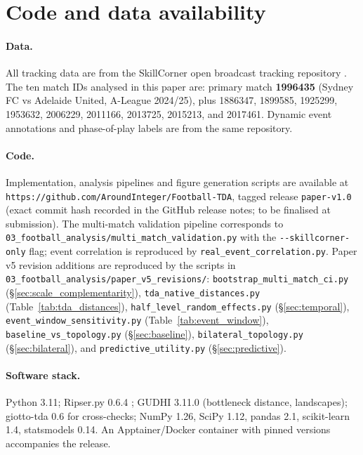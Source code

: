 \documentclass[11pt,a4paper]{article}
\begin{document}
\section*{Code and data availability}

\paragraph{Data.} All tracking data are from the SkillCorner open broadcast tracking repository \citep{SkillCorner2024}. The ten match IDs analysed in this paper are: primary match \textbf{1996435} (Sydney FC vs Adelaide United, A-League 2024/25), plus 1886347, 1899585, 1925299, 1953632, 2006229, 2011166, 2013725, 2015213, and 2017461. Dynamic event annotations and phase-of-play labels are from the same repository.

\paragraph{Code.} Implementation, analysis pipelines and figure generation scripts are available at \texttt{https://github.com/AroundInteger/Football-TDA}, tagged release \texttt{paper-v1.0} (exact commit hash recorded in the GitHub release notes; to be finalised at submission). The multi-match validation pipeline corresponds to \texttt{03\_football\_analysis/multi\_match\_validation.py} with the \texttt{-{}-skillcorner-only} flag; event correlation is reproduced by \texttt{real\_event\_correlation.py}. Paper v5 revision additions are reproduced by the scripts in \texttt{03\_football\_analysis/paper\_v5\_revisions/}: \texttt{bootstrap\_multi\_match\_ci.py} (\S\ref{sec:scale_complementarity}), \texttt{tda\_native\_distances.py} (Table~\ref{tab:tda_distances}), \texttt{half\_level\_random\_effects.py} (\S\ref{sec:temporal}), \texttt{event\_window\_sensitivity.py} (Table~\ref{tab:event_window}), \texttt{baseline\_vs\_topology.py} (\S\ref{sec:baseline}), \texttt{bilateral\_topology.py} (\S\ref{sec:bilateral}), and \texttt{predictive\_utility.py} (\S\ref{sec:predictive}).

\paragraph{Software stack.} Python 3.11; Ripser.py 0.6.4 \citep{Tralie2018}; GUDHI 3.11.0 (bottleneck distance, landscapes); giotto-tda 0.6 \citep{Tauzin2021} for cross-checks; NumPy 1.26, SciPy 1.12, pandas 2.1, scikit-learn 1.4, statsmodels 0.14. An Apptainer/Docker container with pinned versions accompanies the release.
\end{document}
